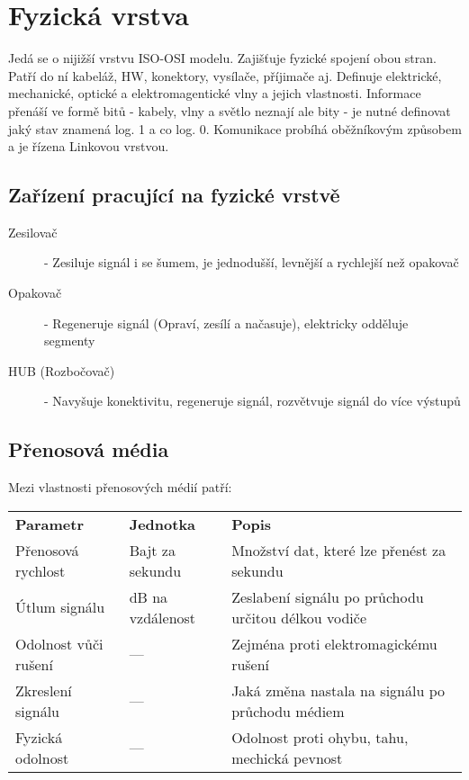 \section{Fyzická vrstva}
\label{sec:fyzicka-vrstva}
Jedá se o nijižší vrstvu ISO-OSI modelu.
Zajišťuje fyzické spojení obou stran.
Patří do ní kabeláž, HW, konektory, vysílače, příjimače aj.
Definuje elektrické, mechanické, optické a elektromagentické vlny a jejich vlastnosti.
Informace přenáší ve formě bitů - kabely, vlny a světlo neznají ale bity - je nutné definovat jaký stav znamená log. 1 a co log. 0.
Komunikace probíhá oběžníkovým způsobem a je řízena Linkovou vrstvou.
\subsection{Zařízení pracující na fyzické vrstvě}
\begin{description}
  \item[Zesilovač]- Zesiluje signál i se šumem, je jednodušší, levnější a rychlejší než opakovač
  \item[Opakovač]- Regeneruje signál (Opraví, zesílí a načasuje), elektricky odděluje segmenty
  \item[HUB (Rozbočovač)]- Navyšuje konektivitu, regeneruje signál, rozvětvuje signál do více výstupů
\end{description}
\subsection{Přenosová média}
Mezi vlastnosti přenosových médií patří:\\
\begin{tabularx}{\linewidth}{l|l|l}
  \textbf{Parametr}    & \textbf{Jednotka} & \textbf{Popis}                                      \\
  Přenosová rychlost   & Bajt za sekundu   & Množství dat, které lze přenést za sekundu          \\
  \hline
  Útlum signálu        & dB na vzdálenost  & Zeslabení signálu po průchodu určitou délkou vodiče \\
  \hline
  Odolnost vůči rušení & ---               & Zejména proti elektromagickému rušení               \\
  \hline
  Zkreslení signálu    & ---               & Jaká změna nastala na signálu po průchodu médiem    \\
  \hline
  Fyzická odolnost     & ---               & Odolnost proti ohybu, tahu, mechická pevnost        \\
\end{tabularx}

